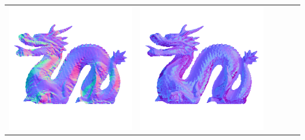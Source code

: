 \begin{tabularx}{\linewidth}{@{}Y@{}Y@{}Y@{}Y@{}Y@{}Y@{}}
\includegraphics[width=\linewidth]{semisynthetic/20160617_21_yu_out.png} &
\includegraphics[width=\linewidth]{semisynthetic/20160617_21_dpsn_out.png} &

\end{tabularx}
